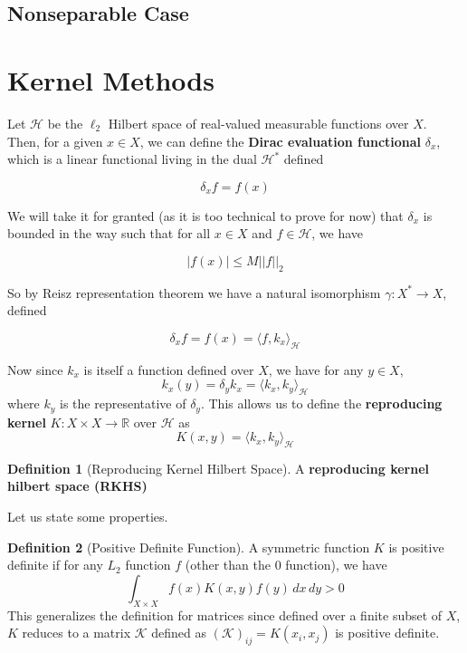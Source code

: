 \documentclass{article}
\theoremstyle{definition}
\newtheorem{definition}{Definition}[section]
\begin{document}
  \subsection{Nonseparable Case} 

\section{Kernel Methods} 

  Let $\mathcal{H}$ be the $\ell_2$ Hilbert space of real-valued measurable functions over $X$. Then, for a given $x \in X$, we can define the \textbf{Dirac evaluation functional} $\delta_x$, which is a linear functional living in the dual $\mathcal{H}^\ast$ defined 

    \[\delta_x f = f(x)\]

  We will take it for granted (as it is too technical to prove for now) that $\delta_x$ is bounded in the way such that for all $x \in X$ and $f \in \mathcal{H}$, we have 

    \[|f(x)| \leq M ||f||_2 \]

  So by Reisz representation theorem we have a natural isomorphism $\gamma: X^\ast \rightarrow X$, defined 

  \[\delta_x f = f(x) = \langle f, k_x \rangle_{\mathcal{H}}\]

  Now since $k_x$ is itself a function defined over $X$, we have for any $y \in X$, 
  \[k_x (y) = \delta_y k_x = \langle k_x, k_y \rangle_{\mathcal{H}}\]
  where $k_y$ is the representative of $\delta_y$. This allows us to define the \textbf{reproducing kernel} $K: X \times X \rightarrow \mathbb{R}$ over $\mathcal{H}$ as 
  \[K(x, y) = \langle k_x, k_y \rangle_{\mathcal{H}}\]


  \begin{definition}[Reproducing Kernel Hilbert Space]
      A \textbf{reproducing kernel hilbert space (RKHS)}
  \end{definition}


  Let us state some properties. 

  \begin{definition}[Positive Definite Function]
    A symmetric function $K$ is positive definite if for any $L_2$ function $f$ (other than the $0$ function), we have 
    \[\int_{X \times X} f(x) K(x, y) f(y) \,dx \,dy > 0\]
    This generalizes the definition for matrices since defined over a finite subset of $X$, $K$ reduces to a matrix $\mathcal{K}$ defined as $(\mathcal{K})_{ij} = K(x_i, x_j)$ is positive definite. 
  \end{definition}
\end{document}
